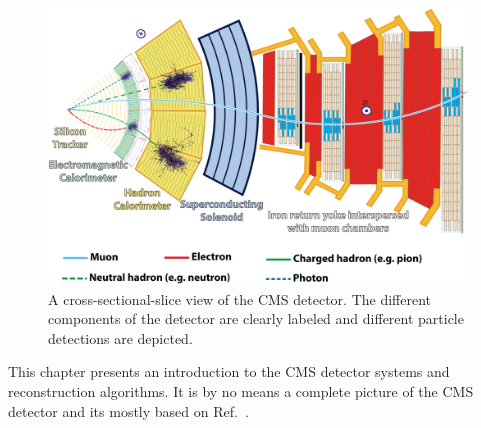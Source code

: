 \begin{figure}
 \centering
\includegraphics[width=0.99\textwidth]{CMS_DetectorFigures/CMSslice.png}
 \caption{A cross-sectional-slice view of the CMS detector. The
   different components of the detector are clearly labeled and
   different particle detections are depicted.\label{fig:cmsSlice}}
\end{figure}

This chapter presents an introduction to the CMS detector systems and
reconstruction algorithms. It is by no means a complete picture of the
CMS detector and its mostly based on Ref.~\cite{Chatrchyan:2008zzk}.
